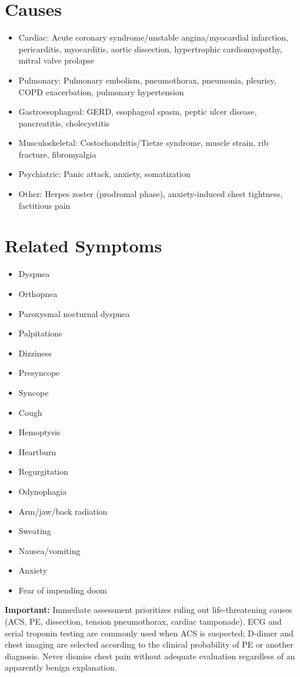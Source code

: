 \section*{Causes}
\begin{itemize}
  \item Cardiac: Acute coronary syndrome/unstable angina/myocardial infarction, pericarditis, myocarditis, aortic dissection, hypertrophic cardiomyopathy, mitral valve prolapse
  \item Pulmonary: Pulmonary embolism, pneumothorax, pneumonia, pleurisy, COPD exacerbation, pulmonary hypertension
  \item Gastroesophageal: GERD, esophageal spasm, peptic ulcer disease, pancreatitis, cholecystitis
  \item Musculoskeletal: Costochondritis/Tietze syndrome, muscle strain, rib fracture, fibromyalgia
  \item Psychiatric: Panic attack, anxiety, somatization
  \item Other: Herpes zoster (prodromal phase), anxiety-induced chest tightness, factitious pain
\end{itemize}

\section*{Related Symptoms}
\begin{itemize}
  \item Dyspnea
  \item Orthopnea
  \item Paroxysmal nocturnal dyspnea
  \item Palpitations
  \item Dizziness
  \item Presyncope
  \item Syncope
  \item Cough
  \item Hemoptysis
  \item Heartburn
  \item Regurgitation
  \item Odynophagia
  \item Arm/jaw/back radiation
  \item Sweating
  \item Nausea/vomiting
  \item Anxiety
  \item Fear of impending doom
\end{itemize}
\textbf{Important:} Immediate assessment prioritizes ruling out life-threatening causes (ACS, PE, dissection, tension pneumothorax, cardiac tamponade). ECG and serial troponin testing are commonly used when ACS is suspected; D-dimer and chest imaging are selected according to the clinical probability of PE or another diagnosis. Never dismiss chest pain without adequate evaluation regardless of an apparently benign explanation.

